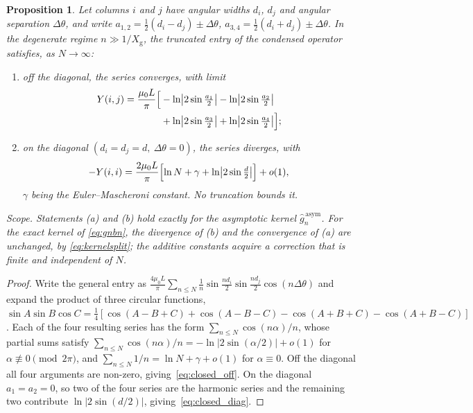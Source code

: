 \documentclass[10pt,a4paper,twocolumn]{article}
\newcommand{\Xg}{X_{\mathrm{g}}}
\theoremstyle{plain}
\newtheorem{proposition}{Proposition}
\theoremstyle{remark}
\begin{document}
\begin{proposition}
\label{prop:closed}
Let columns $i$ and $j$ have angular widths $d_i$, $d_j$ and angular
separation $\Delta\theta$, and write
$a_{1,2}=\tfrac12(d_i-d_j)\pm\Delta\theta$,
$a_{3,4}=\tfrac12(d_i+d_j)\pm\Delta\theta$. In the degenerate regime
$n\gg1/\Xg$, the truncated entry of the condensed operator satisfies, as
$N\to\infty$:
\begin{enumerate}[label=(\alph*),leftmargin=*]
\item off the diagonal, the series converges, with limit
\begin{equation}
\begin{aligned}
Y(i,j)=\frac{\mu_0 L}{\pi}\Bigl[
&-\ln\bigl|2\sin\tfrac{a_1}{2}\bigr|
 -\ln\bigl|2\sin\tfrac{a_2}{2}\bigr|\\
&+\ln\bigl|2\sin\tfrac{a_3}{2}\bigr|
 +\ln\bigl|2\sin\tfrac{a_4}{2}\bigr|\Bigr];
\end{aligned}
\label{eq:closed_off}
\end{equation}
\item on the diagonal $(d_i=d_j=d,\ \Delta\theta=0)$, the series
diverges, with
\begin{equation}
-Y(i,i)=\frac{2\mu_0 L}{\pi}
\Bigl[\ln N+\gamma+\ln\bigl|2\sin\tfrac{d}{2}\bigr|\Bigr]+o(1),
\label{eq:closed_diag}
\end{equation}
$\gamma$ being the Euler--Mascheroni constant. No truncation bounds it.
\end{enumerate}
\emph{Scope.} Statements (a) and (b) hold exactly for the asymptotic
kernel $\hat{g}_n^{\,\mathrm{asym}}$. For the exact kernel of
\eqref{eq:gnbn}, the divergence of (b) and the convergence of (a) are
unchanged, by \eqref{eq:kernelsplit}; the additive constants acquire a
correction that is finite and independent of $N$.
\end{proposition}

\begin{proof}
Write the general entry as
$\frac{4\mu_0L}{\pi}\sum_{n\le N}\frac1n
\sin\frac{nd_i}{2}\sin\frac{nd_j}{2}\cos(n\Delta\theta)$ and expand the
product of three circular functions,
$\sin A\sin B\cos C=\tfrac14[\cos(A-B+C)+\cos(A-B-C)
-\cos(A+B+C)-\cos(A+B-C)]$. Each of the four resulting series has the
form $\sum_{n\le N}\cos(n\alpha)/n$, whose partial sums satisfy
$\sum_{n\le N}\cos(n\alpha)/n=-\ln|2\sin(\alpha/2)|+o(1)$ for
$\alpha\not\equiv0 \pmod{2\pi}$, and
$\sum_{n\le N}1/n=\ln N+\gamma+o(1)$ for $\alpha\equiv0$. Off the
diagonal all four arguments are non-zero, giving~\eqref{eq:closed_off}.
On the diagonal $a_1=a_2=0$, so two of the four series are the harmonic
series and the remaining two contribute
$\ln|2\sin(d/2)|$, giving~\eqref{eq:closed_diag}.
\end{proof}
\end{document}
